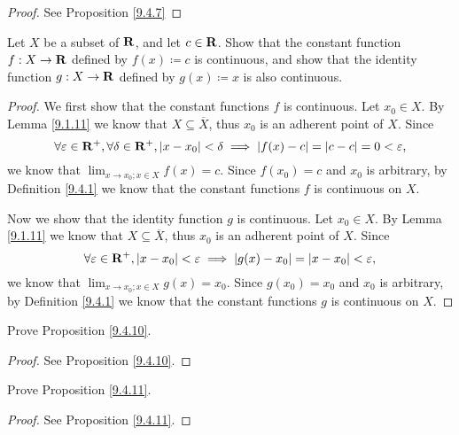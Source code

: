 \begin{proof}
    See Proposition \ref{9.4.7}
\end{proof}

\begin{exercise}\label{ex 9.4.2}
    Let \(X\) be a subset of \(\mathbf{R}\), and let \(c \in \mathbf{R}\).
    Show that the constant function \(f : X \to \mathbf{R}\) defined by \(f(x) \coloneqq c\) is continuous, and show that the identity function \(g : X \to \mathbf{R}\) defined by \(g(x) \coloneqq x\) is also continuous.
\end{exercise}

\begin{proof}
    We first show that the constant functions \(f\) is continuous.
    Let \(x_0 \in X\).
    By Lemma \ref{9.1.11} we know that \(X \subseteq \overline{X}\), thus \(x_0\) is an adherent point of \(X\).
    Since
    \[
        \forall \varepsilon \in \mathbf{R}^+, \forall \delta \in \mathbf{R}^+, \left\lvert x - x_0\right\rvert < \delta \implies \left\lvert f(x) - c\right\rvert = \left\lvert c - c\right\rvert = 0 < \varepsilon,
    \]
    we know that \(\lim_{x \to x_0 ; x \in X} f(x) = c\).
    Since \(f(x_0) = c\) and \(x_0\) is arbitrary, by Definition \ref{9.4.1} we know that the constant functions \(f\) is continuous on \(X\).

    Now we show that the identity function \(g\) is continuous.
    Let \(x_0 \in X\).
    By Lemma \ref{9.1.11} we know that \(X \subseteq \overline{X}\), thus \(x_0\) is an adherent point of \(X\).
    Since
    \[
        \forall \varepsilon \in \mathbf{R}^+, \left\lvert x - x_0\right\rvert < \varepsilon \implies \left\lvert g(x) - x_0\right\rvert = \left\lvert x - x_0\right\rvert < \varepsilon,
    \]
    we know that \(\lim_{x \to x_0 ; x \in X} g(x) = x_0\).
    Since \(g(x_0) = x_0\) and \(x_0\) is arbitrary, by Definition \ref{9.4.1} we know that the constant functions \(g\) is continuous on \(X\).
\end{proof}

\begin{exercise}\label{ex 9.4.3}
    Prove Proposition \ref{9.4.10}.
\end{exercise}

\begin{proof}
    See Proposition \ref{9.4.10}.
\end{proof}

\begin{exercise}\label{ex 9.4.4}
    Prove Proposition \ref{9.4.11}.
\end{exercise}

\begin{proof}
    See Proposition \ref{9.4.11}.
\end{proof}


